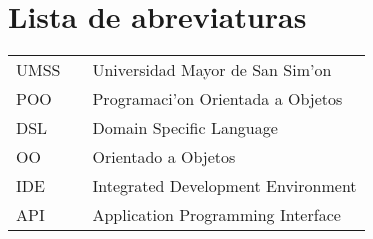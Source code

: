 \chapter{Lista de abreviaturas}

\begin{center}
\begin{tabular}{lcl}
UMSS   &              & Universidad Mayor de San Sim'on \\
POO    &              & Programaci'on Orientada a Objetos \\
DSL    & 			  & Domain Specific Language \\
OO     &              & Orientado a Objetos \\
IDE    &              & Integrated Development Environment \\
API    &              & Application Programming Interface \\
\end{tabular}
\end{center}